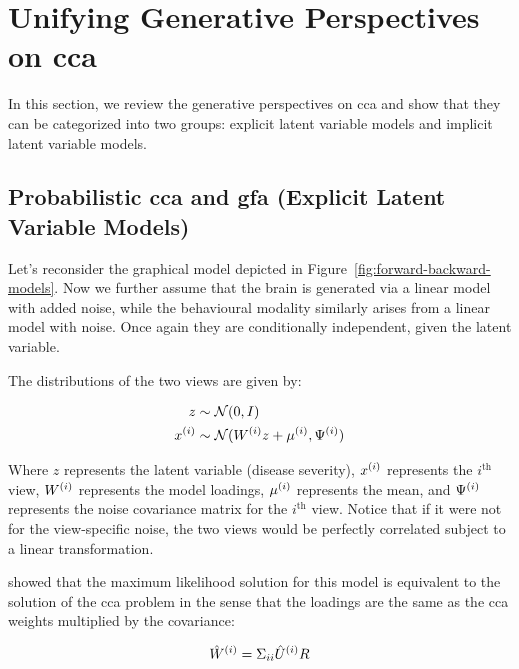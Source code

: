 \newpage


\section{Unifying Generative Perspectives on \acrshort{cca}}\label{sec:generative-perspectives}

In this section, we review the generative perspectives on \acrshort{cca} and show that they can be categorized into two groups: explicit latent variable models and implicit latent variable models.

\subsection{Probabilistic \acrshort{cca} and \acrshort{gfa} (Explicit Latent Variable Models)}\label{subsubsec:a-probabilistic-latent-variable-perspective}

Let's reconsider the graphical model depicted in Figure~\ref{fig:forward-backward-models}.
Now we further assume that the brain is generated via a linear model with added noise, while the behavioural modality similarly arises from a linear model with noise.
Once again they are conditionally independent, given the latent variable.

The distributions of the two views are given by:

\begin{align}
    z& \sim \mathcal{N}(0, I)\\
    x^{(i)} & \sim \mathcal{N}(W^{(i)} z + \mu^{(i)}, \Psi^{(i)})
\end{align}

Where \(z\) represents the latent variable (disease severity), \(x^{(i)}\) represents the $i^{\text{th}}$ view, \(W^{(i)}\) represents the model loadings, \(\mu^{(i)}\) represents the mean, and \(\Psi^{(i)}\) represents the noise covariance matrix for the $i^{\text{th}}$ view.
Notice that if it were not for the view-specific noise, the two views would be perfectly correlated subject to a linear transformation.

\citet{bach2005probabilistic} showed that the maximum likelihood solution for this model is equivalent to the solution of the \acrshort{cca} problem in the sense that the \gls{loadings} are the same as the \acrshort{cca} weights multiplied by the covariance:

\begin{align}
    \label{eq:probabilistic-cca}
    \hat{W}^{(i)} = \Sigma_{ii} \hat{U}^{(i)} R
\end{align}

